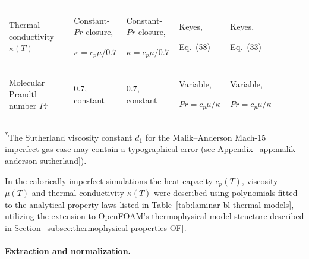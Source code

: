 \begin{table}[H]
\begin{tabular}{@{}p{0.23\linewidth}p{0.165\linewidth}p{0.165\linewidth}p{0.17\linewidth}p{0.18\linewidth}@{}}
        \addlinespace
        \raggedright Thermal conductivity \(\kappa(T)\)
            & {\raggedright Constant-\(Pr\) closure,\par \(\kappa=c_p\mu/0.7\)\par}
            & {\raggedright Constant-\(Pr\) closure,\par \(\kappa=c_p\mu/0.7\)\par}
            & {\raggedright Keyes,\par Eq.~(58)\par}
            & {\raggedright Keyes,\par Eq.~(33)\par} \\
        \addlinespace
        \raggedright Molecular Prandtl number \(Pr\)
            & \(0.7\), constant
            & \(0.7\), constant
            & {\raggedright Variable,\par \(Pr=c_p\mu/\kappa\)\par}
            & {\raggedright Variable,\par \(Pr=c_p\mu/\kappa\)\par} \\
        \bottomrule
    \end{tabular}
    \par\smallskip
    {\footnotesize\raggedright \textsuperscript{*}The Sutherland viscosity constant \(d_1\) for the Malik--Anderson Mach-15 imperfect-gas case may contain a typographical error (see Appendix~\ref{app:malik-anderson-sutherland}).\par}
\end{table}

In the calorically imperfect simulations the heat-capacity \(c_p(T)\), viscosity \(\mu(T)\) and thermal conductivity \(\kappa(T)\) were described using polynomials fitted to the analytical property laws listed in Table~\ref{tab:laminar-bl-thermal-models}, utilizing the extension to OpenFOAM's thermophysical model structure described in
Section~\ref{subsec:thermophysical-properties-OF}.

\paragraph{Extraction and normalization.}

